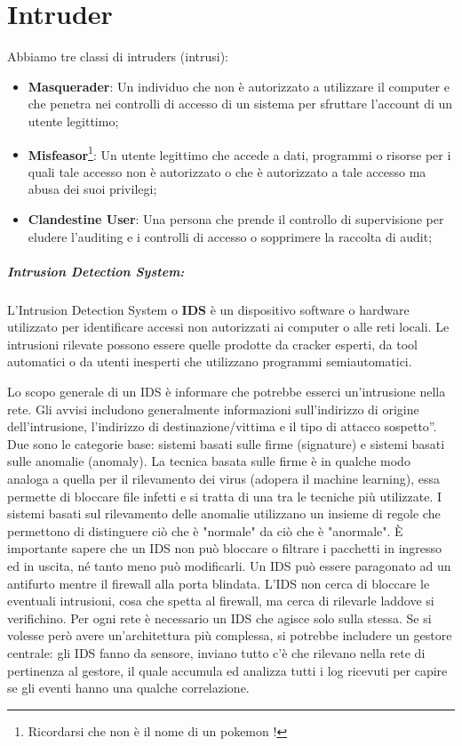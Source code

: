 \chapter{Intruder}

Abbiamo tre classi di intruders (intrusi):

\begin{itemize}
    \item \textbf{Masquerader}: Un individuo che non è autorizzato a utilizzare il
          computer e che penetra nei
          controlli di accesso di un sistema per sfruttare l'account di un utente
          legittimo;
    \item \textbf{Misfeasor}\footnote{Ricordarsi che non è
              il nome di un pokemon !}: Un utente legittimo che accede a dati,
          programmi o
          risorse per i
          quali tale
          accesso non è autorizzato o che è autorizzato a tale accesso ma
          abusa dei suoi
          privilegi;
    \item \textbf{Clandestine User}: Una persona che prende il controllo di supervisione
          per eludere l'auditing
          e i controlli di accesso o sopprimere la raccolta di audit;
\end{itemize}

\paragraph{Intrusion Detection System: }
L'Intrusion Detection System o \textbf{IDS} è un dispositivo software o hardware
utilizzato per
identificare accessi non autorizzati ai computer o alle reti locali.
Le intrusioni rilevate possono
essere quelle prodotte da cracker esperti, da tool automatici o da utenti
inesperti che utilizzano
programmi semiautomatici.

Lo scopo generale di un IDS è informare che potrebbe esserci un'intrusione nella rete. Gli avvisi
includono generalmente informazioni sull'indirizzo di origine dell'intrusione,
l'indirizzo di
destinazione/vittima e il tipo di attacco sospetto”.
Due sono le categorie base: sistemi basati sulle firme (signature) e sistemi
basati sulle anomalie (anomaly).
La tecnica basata sulle firme è in qualche modo analoga a quella per
il rilevamento dei
virus (adopera il machine learning), essa permette di bloccare file infetti e
si tratta di una tra le tecniche più utilizzate. I sistemi basati sul rilevamento delle anomalie utilizzano un
insieme di regole che
permettono di distinguere ciò che è "normale" da ciò che è "anormale".
È importante sapere che un IDS non può bloccare o filtrare i pacchetti in ingresso
ed in uscita, né
tanto meno può modificarli. Un IDS può essere paragonato ad un antifurto mentre
il firewall alla
porta blindata. L'IDS non cerca di bloccare le eventuali intrusioni, cosa che
spetta al firewall, ma
cerca di rilevarle laddove si verifichino.
Per ogni rete è necessario un IDS che agisce solo sulla stessa. Se si volesse
però avere
un'architettura più complessa, si potrebbe includere un gestore centrale:
gli IDS fanno da sensore,
inviano tutto c'è che rilevano nella rete di pertinenza al gestore,
il quale accumula ed analizza tutti i
log ricevuti per capire se gli eventi hanno una qualche correlazione.

